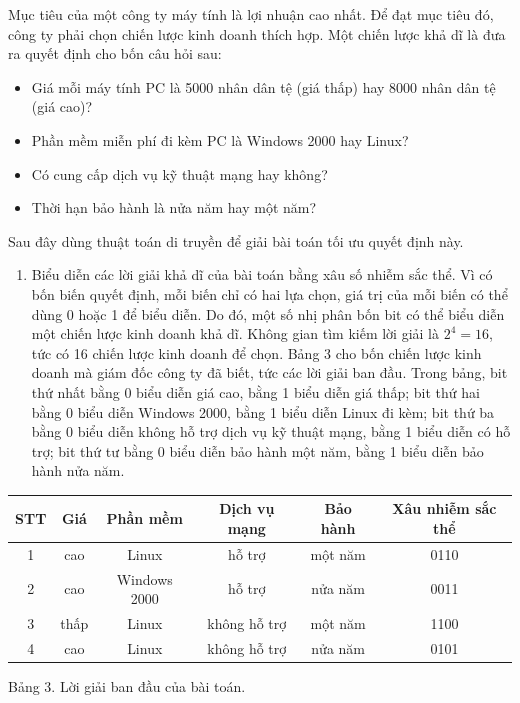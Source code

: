 \documentclass[11pt]{article}
\begin{document}
Mục tiêu của một công ty máy tính là lợi nhuận cao nhất. Để đạt mục tiêu đó,
công ty phải chọn chiến lược kinh doanh thích hợp. Một chiến lược khả dĩ là
đưa ra quyết định cho bốn câu hỏi sau:
\begin{itemize}
  \item Giá mỗi máy tính PC là 5000 nhân dân tệ (giá thấp) hay 8000 nhân dân
  tệ (giá cao)?
  \item Phần mềm miễn phí đi kèm PC là Windows 2000 hay Linux?
  \item Có cung cấp dịch vụ kỹ thuật mạng hay không?
  \item Thời hạn bảo hành là nửa năm hay một năm?
\end{itemize}

Sau đây dùng thuật toán di truyền để giải bài toán tối ưu quyết định này.

\begin{enumerate}
  \item Biểu diễn các lời giải khả dĩ của bài toán bằng xâu số nhiễm sắc thể.
  Vì có bốn biến quyết định, mỗi biến chỉ có hai lựa chọn, giá trị của mỗi
  biến có thể dùng 0 hoặc 1 để biểu diễn. Do đó, một số nhị phân bốn bit có
  thể biểu diễn một chiến lược kinh doanh khả dĩ. Không gian tìm kiếm lời
  giải là \(2^4=16\), tức có 16 chiến lược kinh doanh để chọn. Bảng 3 cho
  bốn chiến lược kinh doanh mà giám đốc công ty đã biết, tức các lời giải ban
  đầu. Trong bảng, bit thứ nhất bằng 0 biểu diễn giá cao, bằng 1 biểu diễn
  giá thấp; bit thứ hai bằng 0 biểu diễn Windows 2000, bằng 1 biểu diễn
  Linux đi kèm; bit thứ ba bằng 0 biểu diễn không hỗ trợ dịch vụ kỹ thuật
  mạng, bằng 1 biểu diễn có hỗ trợ; bit thứ tư bằng 0 biểu diễn bảo hành một
  năm, bằng 1 biểu diễn bảo hành nửa năm.
\end{enumerate}

\begin{center}
\begin{tabular}{c|ccccc}
STT & Giá & Phần mềm & Dịch vụ mạng & Bảo hành & Xâu nhiễm sắc thể\\ \hline
1 & cao & Linux & hỗ trợ & một năm & 0110\\
2 & cao & Windows 2000 & hỗ trợ & nửa năm & 0011\\
3 & thấp & Linux & không hỗ trợ & một năm & 1100\\
4 & cao & Linux & không hỗ trợ & nửa năm & 0101
\end{tabular}

Bảng 3. Lời giải ban đầu của bài toán.
\end{center}
\end{document}
